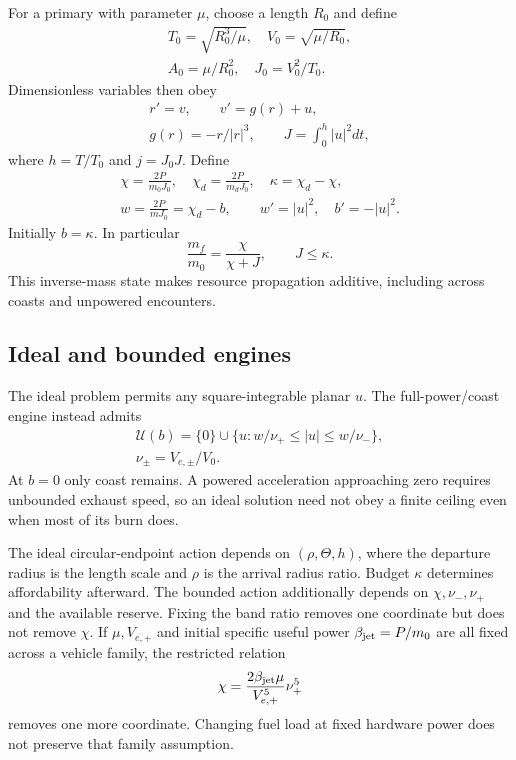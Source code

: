 For a primary with parameter $\mu$, choose a length $R_0$ and define
\begin{equation}
 \begin{gathered}
 T_0=\sqrt{R_0^3/\mu},\quad V_0=\sqrt{\mu/R_0},\\
 A_0=\mu/R_0^2,\quad J_0=V_0^2/T_0.
 \end{gathered}
\end{equation}
Dimensionless variables then obey
\begin{equation}
 \begin{gathered}
 r'=v,\qquad v'=g(r)+u,\\
 g(r)=-r/|r|^3,\qquad J=\int_0^h|u|^2dt,
 \end{gathered}
 \label{eq:kepler}
\end{equation}
where $h=T/T_0$ and $j=J_0J$. Define
\begin{equation}
 \begin{gathered}
 \chi=\frac{2P}{m_0J_0},\quad
 \chi_d=\frac{2P}{m_dJ_0},\quad
 \kappa=\chi_d-\chi,\\
 w=\frac{2P}{mJ_0}=\chi_d-b,\qquad
 w'=|u|^2,\quad b'=-|u|^2.
 \end{gathered}
 \label{eq:resource}
\end{equation}
Initially $b=\kappa$. In particular
\begin{equation}
 \frac{m_f}{m_0}=\frac{\chi}{\chi+J},\qquad
 J\le\kappa.
 \label{eq:massratio}
\end{equation}
This inverse-mass state makes resource propagation additive, including
across coasts and unpowered encounters.

\subsection{Ideal and bounded engines}
The ideal problem permits any square-integrable planar $u$. The
full-power/coast engine instead admits
\begin{equation}
 \begin{gathered}
 \mathcal U(b)=\{0\}\cup\{u:w/\nu_+\le|u|\le w/\nu_-\},\\
 \nu_\pm=V_{e,\pm}/V_0.
 \end{gathered}
 \label{eq:controlset}
\end{equation}
At $b=0$ only coast remains. A powered acceleration approaching zero
requires unbounded exhaust speed, so an ideal solution need not obey a
finite ceiling even when most of its burn does.

The ideal circular-endpoint action depends on $(\rho,\Theta,h)$, where
the departure radius is the length scale and $\rho$ is the arrival
radius ratio. Budget $\kappa$ determines affordability afterward.
The bounded action additionally depends on $\chi,\nu_-,\nu_+$ and the
available reserve. Fixing the band ratio removes one coordinate but
does not remove $\chi$. If $\mu,V_{e,+}$ and initial specific useful power
$\beta_{\rm jet}=P/m_0$ are all fixed across a vehicle family, the restricted
relation
\begin{equation}
 \chi=\frac{2\beta_{\rm jet}\mu}{V_{e,+}^{5}}\nu_+^5
\end{equation}
removes one more coordinate. Changing fuel load at fixed hardware power
does not preserve that family assumption.

